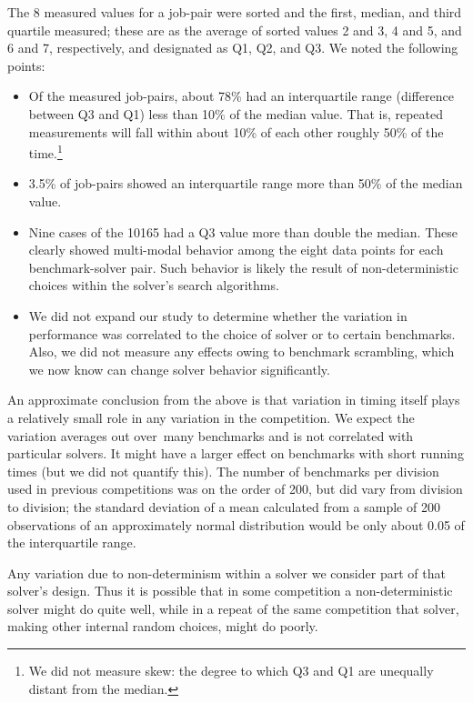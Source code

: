 \documentclass[smallcondensed]{svjour3}
\begin{document}
The 8 measured values for a job-pair were sorted and the first, median, and third quartile measured; these are as the average of sorted values 2 and 3, 4 and 5, and 6 and 7, respectively, and designated as Q1, Q2, and Q3. We noted the following points:
\begin{itemize}[noitemsep,nolistsep]
\item Of the measured job-pairs, about 78\% had an interquartile range (difference between Q3 and Q1) less than 10\% of the median value. That is, repeated measurements will fall within about 10\% of each other roughly 50\% of the time.\footnote{We did not measure skew: the degree to which Q3 and Q1 are unequally distant from the median.}
\item 3.5\% of job-pairs showed an interquartile range more than 50\% of the median value. 
\item Nine cases of the 10165 had a Q3 value more than double the median. These clearly showed multi-modal behavior among the eight data points for each benchmark-solver pair. Such behavior is likely the result of non-deterministic choices within the solver's search algorithms. 
\item We did not expand our study to determine whether the variation in performance was correlated to the choice of solver or to certain benchmarks. Also, we did not measure any effects owing to benchmark scrambling, which we now know can change solver behavior significantly.
\end{itemize}

An approximate conclusion from the above is that variation in timing itself plays a relatively small role in any variation in the competition. We expect the variation averages out over\ many benchmarks and is not correlated with particular solvers. It might have a larger effect on benchmarks with short running times (but we did not quantify this). The number of benchmarks per division used in previous competitions was on the order of 200, but did vary from division to division; the standard deviation of a mean calculated from a sample of 200 observations of an approximately normal distribution would be only about 0.05 of the interquartile range. 

Any variation due to non-determinism within a solver we consider part of that solver's design. Thus it is possible that in some competition a non-deterministic solver might do quite well, while in a repeat of the same competition that solver, making other internal random choices, might do poorly. 
\end{document}
